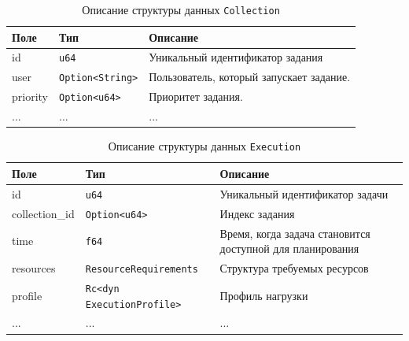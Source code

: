 \documentclass[t]{beamer}  %
\begin{document}
	\begin{frame}[fragile]
		\frametitle{\insertsection} 
		\framesubtitle{\insertsubsection}

		\begin{table}[H]
			\scriptsize
			\centering
			\begin{tabular}{|l|l|p{7cm}|}
				\hline
				\textbf{Поле} & \textbf{Тип} & \textbf{Описание} \\ 
				\hline
				id & \texttt{u64} & Уникальный идентификатор задания \\
				\hline
				user & \texttt{Option<String>} & Пользователь, который запускает задание.  \\
				\hline
				priority & \texttt{Option<u64>} & Приоритет задания. \\
				\hline
				... & ... & ... \\
				\hline
			\end{tabular}
			\caption*{Описание структуры данных \texttt{Collection}}
			\label{tab:collection}
		\end{table}

\vspace{-0.5cm}

\begin{table}[h]
    \centering
	\scriptsize
    \begin{tabular}{|l|l|p{5cm}|}
        \hline
        \textbf{Поле} & \textbf{Тип} & \textbf{Описание} \\
        \hline
        id & \texttt{u64} & Уникальный идентификатор задачи \\
        \hline
        collection\_id & \texttt{Option<u64>} & Индекс задания  \\
        \hline
        time & \texttt{f64} & Время, когда задача становится доступной для планирования \\
		\hline
        resources & \texttt{ResourceRequirements} & Структура требуемых ресурсов \\
        \hline
        profile & \texttt{Rc<dyn ExecutionProfile>} & Профиль нагрузки \\
        \hline
		... & ... & ... \\
		\hline
    \end{tabular}
    \caption*{Описание структуры данных \texttt{Execution}}
\end{table}

	\end{frame}
\end{document}
